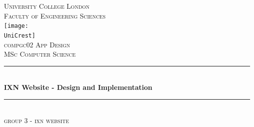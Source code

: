 \documentclass[fontsize=10pt]{extarticle}
\numberwithin{figure}{section} %
\newcommand{\AssignmentTitle}{IXN Website - Design and Implementation}
\newcommand{\ModuleTitle}{compgc02 App Design}
\newcommand{\DegreeTitle}{MSc Computer Science}
\newcommand{\University}{University College London}
\newcommand{\Faculty}{Faculty of Engineering Sciences}
\newcommand{\UniCrest}{logoucl.png}
\newcommand{\GroupName}{group 3 - ixn website}
\newcommand{\horrule}[1]{\rule{\linewidth}{#1}}
\begin{document}
% 

  \setlength{\abovedisplayskip}{-18pt}
  \setlength{\belowdisplayskip}{0pt}
  \setlength{\abovedisplayshortskip}{-18pt}
  \setlength{\belowdisplayshortskip}{0pt}



\begin{titlepage}

	\center %
		\normalfont \normalsize \textsc{\University} \\ [10pt]
		\normalfont \normalsize \textsc{\Faculty} \\ [25pt]
		\texttt{[image: \\UniCrest]}\\[0.5cm]
		\normalfont \normalsize \textsc{\ModuleTitle} \\ [10pt]
    \normalfont \normalsize \textsc{\DegreeTitle} \\ [25pt]
		\horrule{0.5pt} \\[0.4cm]
		\huge \textbf{\AssignmentTitle} \\
		\horrule{2pt} \\[0.5cm]
\normalfont \normalsize \textsc{\GroupName} \\ [25pt]

\end{titlepage}
\end{document}
